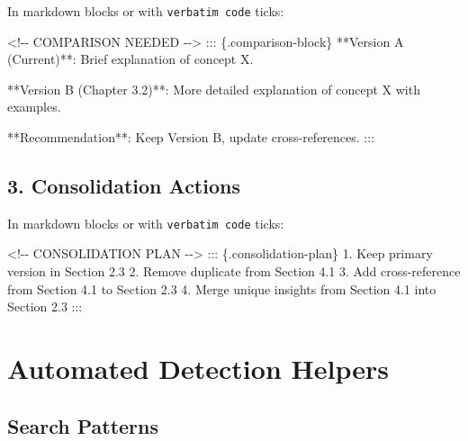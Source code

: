 \documentclass[
  11pt,
  letterpaper,
]{book}
\newenvironment{Shaded}{\begin{snugshade}}{\end{snugshade}}
\newcommand{\CommentTok}[1]{\textcolor[rgb]{0.37,0.37,0.37}{#1}}
\newcommand{\NormalTok}[1]{\textcolor[rgb]{0.00,0.23,0.31}{#1}}
\newcommand{\SpecialStringTok}[1]{\textcolor[rgb]{0.13,0.47,0.30}{#1}}
\begin{document}
In markdown blocks or with \texttt{verbatim\ code} ticks:

\begin{Shaded}
\begin{Highlighting}[]
\CommentTok{\textless{}!{-}{-} COMPARISON NEEDED {-}{-}\textgreater{}}
\NormalTok{::: \{.comparison{-}block\}}
\NormalTok{**Version A (Current)**: }
\NormalTok{Brief explanation of concept X.}

\NormalTok{**Version B (Chapter 3.2)**:}
\NormalTok{More detailed explanation of concept X with examples.}

\NormalTok{**Recommendation**: Keep Version B, update cross{-}references.}
\NormalTok{:::}
\end{Highlighting}
\end{Shaded}

\subsection*{3. Consolidation Actions}\label{consolidation-actions}

In markdown blocks or with \texttt{verbatim\ code} ticks:

\begin{Shaded}
\begin{Highlighting}[]
\CommentTok{\textless{}!{-}{-} CONSOLIDATION PLAN {-}{-}\textgreater{}}
\NormalTok{::: \{.consolidation{-}plan\}}
\SpecialStringTok{1. }\NormalTok{Keep primary version in Section 2.3}
\SpecialStringTok{2. }\NormalTok{Remove duplicate from Section 4.1}
\SpecialStringTok{3. }\NormalTok{Add cross{-}reference from Section 4.1 to Section 2.3}
\SpecialStringTok{4. }\NormalTok{Merge unique insights from Section 4.1 into Section 2.3}
\NormalTok{:::}
\end{Highlighting}
\end{Shaded}

\section*{Automated Detection
Helpers}\label{automated-detection-helpers}


\subsection*{Search Patterns}\label{search-patterns}
\end{document}
